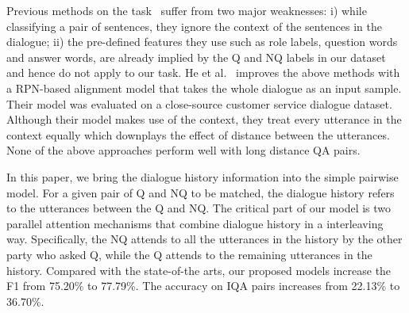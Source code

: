 
Previous methods on the task~\cite{ding2008using,du2017discovering,jiang2018learning} suffer from two major weaknesses: i) while classifying a pair of sentences, they ignore the context of the sentences in the dialogue; ii) the pre-defined features they use such as role labels, question words and answer words, are already implied by the Q and NQ labels in our dataset and hence do not apply to our task. He et al.~ improves the above methods with a RPN-based alignment model that takes the whole dialogue as an input sample. Their model was evaluated on a close-source customer service dialogue dataset. Although their model makes use of the context, they treat every utterance in the context equally which downplays the effect of distance between the utterances. None of the above approaches perform well with long distance QA pairs.

In this paper, we bring the dialogue history information into the simple pairwise model. For a given pair of Q and NQ to be matched, the dialogue history refers to the utterances between the Q and NQ. The critical part of our model is two parallel attention mechanisms that combine dialogue history in a interleaving way. Specifically, the NQ attends to all the utterances in the history by the other party who asked Q, while the Q attends to the remaining utterances in the history. Compared with the state-of-the arts, our proposed models increase the F1 from 75.20\% to 77.79\%. The accuracy on IQA pairs increases from 22.13\% to 36.70\%.



